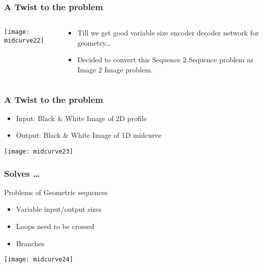 \begin{frame}[fragile]\frametitle{A Twist to the problem}

  \begin{columns}[t]
    \begin{column}[T]{0.4\linewidth}
      \centering
      \texttt{[image: midcurve22]}
    \end{column}
    \begin{column}[T]{0.6\linewidth}
	\begin{itemize}
	\item Till we get good variable size encoder decoder network for geometry…
	\item Decided to convert this Sequence 2 Sequence problem as Image 2 Image problem.
	\end{itemize}
    \end{column}
  \end{columns}
  \end{frame}
  
\begin{frame}[fragile]\frametitle{A Twist to the problem}

	\begin{itemize}
	\item Input: Black \& White Image of 2D profile
	\item Output: Black \& White Image of 1D midcurve
	\end{itemize}
\begin{center}
\texttt{[image: midcurve23]}
\end{center}	
\end{frame}

\begin{frame}[fragile]\frametitle{Solves \ldots}
Problems of Geometric sequences

	\begin{itemize}
	\item Variable input/output sizes
	\item Loops need to be crossed
	\item Branches
	\end{itemize}
\begin{center}
\texttt{[image: midcurve24]}
\end{center}	
\end{frame}

